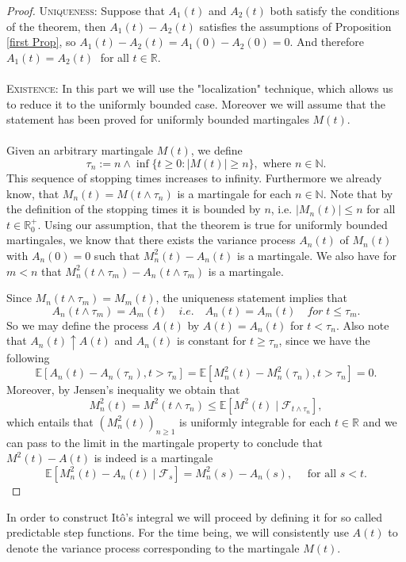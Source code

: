 \documentclass[11pt,a4paper, final]{article}
\begin{document}
\begin{proof}
\textsc{Uniqueness:} Suppose that $A_1(t)$ and $A_2(t)$ both satisfy the conditions of the theorem, then $A_1(t)-A_2(t)$ satisfies the assumptions of Proposition \ref{first Prop}, so $A_1(t)-A_2(t)=A_1(0)-A_2(0)=0$. And therefore $A_1(t)=A_2(t) \;$ for all $t \in \mathbb{R}$. 
\\\\
\textsc{Existence:} In this part we will use the "localization" technique, which allows us to reduce it to the uniformly bounded case. Moreover we will assume that the statement has been proved for uniformly bounded martingales $M(t)$. %
\\\\
Given an arbitrary martingale $M(t)$, we define
$$\tau_n := n \wedge \inf\{t \geq 0: |M(t)|\geq n\}, \text{ where } n \in \mathbb{N}.$$
This sequence of stopping times increases to infinity. Furthermore we already know, that $M_n(t)=M(t \wedge \tau_n)$ is a martingale for each $n \in \mathbb{N}$. Note that by the definition of the stopping times it is bounded by $n$, i.e. $| M_n(t) |\leq n$ for all $t \in \mathbb{R}_0^+$. Using our assumption, that the theorem is true for uniformly bounded martingales, we know that there exists the variance process $A_n(t)$ of $M_n(t)$ with $A_n(0)=0$ such that $M_n^2(t)-A_n(t)$ is a martingale. We also have for $m<n$ that $M_n^2(t \wedge \tau_m)-A_n(t \wedge \tau_m)$ is a martingale. 
\newpage

\noindent Since $M_n(t \wedge \tau_m)=M_m(t)$, the uniqueness statement implies that 
$$A_n(t \wedge \tau_m)=A_m(t) \quad i.e.\quad  A_n(t)=A_m(t) \quad for \;t\leq \tau_m.$$
So we may define the process $A(t)$ by $A(t)=A_n(t)$ for $t<\tau_n$. Also note that $A_n(t) \uparrow A(t)$ and $A_n(t)$ is constant for $t\geq \tau_n$, since we have the following
$$\mathbb{E}[A_n(t)-A_n(\tau_n), t>\tau_n]= \mathbb{E}[M_n^2(t)-M_n^2(\tau_n), t>\tau_n]=0.$$
Moreover, by Jensen's inequality we obtain that
$$M_n^2(t)=M^2(t \wedge \tau_n) \leq \mathbb{E}[M^2(t) \mid \mathcal{F}_{t \wedge \tau_n}],$$
which entails that $(M_n^2(t))_{n\geq 1}$ is uniformly integrable for each $t \in \mathbb{R}$ and we can pass to the limit in the martingale property to conclude that $M^2(t)-A(t)$ is indeed is a martingale
$$\mathbb{E}[M_n^2(t)-A_n(t) \mid \mathcal{F}_s]=M_n^2(s)-A_n(s), \quad \text{ for all }s<t.$$
\end{proof}
\noindent In order to construct Itô's integral we will proceed by defining it for so called predictable step functions. For the time being, we will consistently use $A(t)$ to denote the variance process corresponding to the martingale $M(t)$. 
\end{document}
